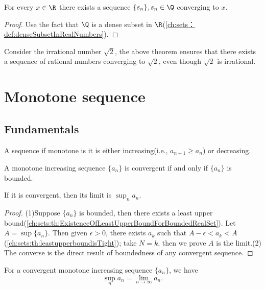 \begin{refsection}
\begin{corollary}\label{ch:sequences-series:th:SequentialDensityOfRationals}
For every $x\in \R$	there exists a sequence $\{s_n\}, s_n\in \Q$ converging to $x$.	
\end{corollary}
\begin{proof}
Use the fact that $\Q$ is a dense subset in $\R$(\autoref{ch:sets：def:denseSubsetInRealNumbers}).
\end{proof}

\begin{example}
Consider the irrational number $\sqrt{2}$, the above theorem ensures that there exists a sequence of rational numbers converging to $\sqrt{2}$, even though $\sqrt{2}$ is irrational.	
\end{example}



\section{Monotone sequence}
\subsection{Fundamentals}
\begin{definition} 
A sequence if monotone is it is either increasing(i.e., $a_{n+1}\geq a_n$) or decreasing.
\end{definition}


\begin{theorem}\label{ch:sequences-series:th:monotoneSequenceConvergence}\cite[48]{johnsonbaugh2010foundations}
A monotone increasing sequence $\{a_n\}$ is convergent if and only if $\{a_n\}$ is bounded. 

If it is convergent, then its limit is $\sup_n a_n.$
\end{theorem}
\begin{proof}
(1)Suppose $\{a_n\}$ is bounded, then there exists a least upper bound(\autoref{ch:sets:th:ExistenceOfLeastUpperBoundForBoundedRealSet}). Let $A = \sup \{a_n\}$. Then given $\epsilon > 0$, there exists $a_k$ such that $A-\epsilon < a_k < A$(\autoref{ch:sets:th:leastupperboundisTight}); take $N=k$, then we prove $A$ is the limit.(2) The converse is the direct result of boundedness of any convergent sequence. 	
\end{proof}

\begin{note}\label{ch:sequences-series:Remark：EquivalenceSupAndSequentialLimitMonotoneSequence}
For a convergent monotone increasing sequence $\{a_n\}$, we have
$$\sup_n a_n = \lim_{n\to \infty} a_n.$$


\end{note}
\end{refsection}
